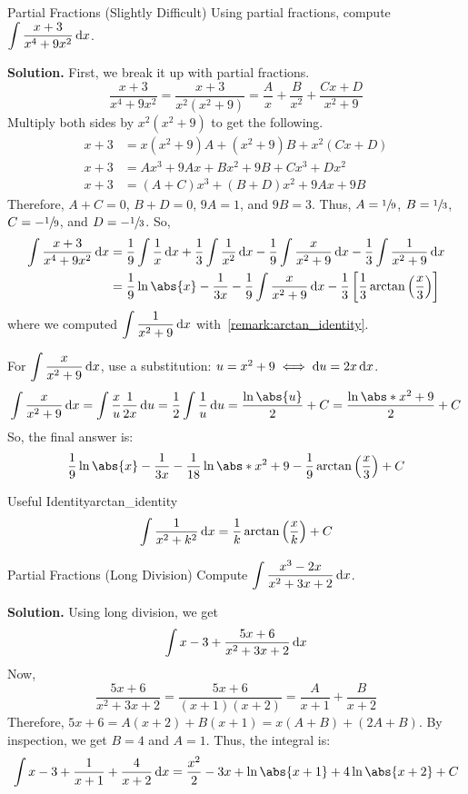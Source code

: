 \begin{Example}{Partial Fractions (Slightly Difficult)}{}
    Using partial fractions, compute $ \displaystyle \int \frac{x+3}{x^4+9x^2} \odif{x} $.

    \textbf{Solution.}
    First, we break it up with partial fractions.
    \[ \frac{x+3}{x^4+9x^2} =\frac{x+3}{x^2(x^2+9)}=\frac{A}{x}+\frac{B}{x^2} +\frac{Cx+D}{x^2+9}  \]
    Multiply both sides by $ x^2(x^2+9) $ to get the following.
    \begin{align*}
        x+3 & =x(x^2+9)A+(x^2+9)B+x^2(Cx+D) \\
        x+3 & =Ax^3+9Ax+Bx^2+9B+Cx^3+Dx^2   \\
        x+3 & =(A+C)x^3+(B+D)x^2+9Ax+9B
    \end{align*}
    Therefore, $ A+C=0 $, $ B+D=0 $, $ 9A=1 $, and $ 9B=3 $. Thus,
    $ A=\sfrac{1}{9} $, $ B=\sfrac{1}{3} $, $ C=-\sfrac{1}{9} $,
    and $ D=-\sfrac{1}{3} $. So,
    \begin{align*}
        \int \frac{x+3}{x^4+9x^2} \odif{x}
         & =\frac{1}{9} \int \frac{1}{x} \odif{x} +\frac{1}{3} \int \frac{1}{x^2} \odif{x}
        -\frac{1}{9} \int \frac{x}{x^2+9} \odif{x} -\frac{1}{3} \int \frac{1}{x^2+9} \odif{x} \\
         & =\frac{1}{9}\ln\abs{x}-\frac{1}{3x}-\frac{1}{9} \int \frac{x}{x^2+9}\odif{x}
        -\frac{1}{3} \left[ \frac{1}{3}\arctan\left( \frac{x}{3}  \right) \right]             \\
    \end{align*}
    where we computed $ \displaystyle \int \frac{1}{x^2+9}\odif{x} $ with~\ref{remark:arctan_identity}.

    For $ \displaystyle \int \frac{x}{x^2+9} \odif{x}  $, use a substitution: $ u=x^2+9\iff \odif{u}=2x\odif{x} $.
    \[
        \int \frac{x}{x^2+9} \odif{x}
        =\int \frac{x}{u} \frac{1}{2x} \odif{u}
        =\frac{1}{2} \int \frac{1}{u} \odif{u}
        =\frac{\ln\abs{u}}{2} +C
        =\frac{\ln\abs*{x^2+9}}{2} +C
    \]
    So, the final answer is:
    \[ \frac{1}{9}\ln\abs{x}-\frac{1}{3x}-\frac{1}{18}\ln\abs*{x^2+9}
        -\frac{1}{9} \arctan\left( \frac{x}{3}  \right)+C \]
\end{Example}

\begin{Remark}{Useful Identity}{arctan_identity}
    \[ \int \frac{1}{x^2+k^2} \odif{x}=\frac{1}{k} \arctan\left( \frac{x}{k}  \right)+C  \]
\end{Remark}

\begin{Example}{Partial Fractions (Long Division)}{}
    Compute $ \displaystyle \int \frac{x^3-2x}{x^2+3x+2} \odif{x} $.

    \textbf{Solution.}
    Using long division, we get
    \[ \int x-3+\frac{5x+6}{x^2+3x+2} \odif{x}  \]
    Now,
    \[ \frac{5x+6}{x^2+3x+2} =\frac{5x+6}{(x+1)(x+2)} =\frac{A}{x+1} +\frac{B}{x+2} \]
    Therefore, $ 5x+6=A(x+2)+B(x+1) = x(A+B)+(2A+B)$. By inspection,
    we get $ B=4 $ and $ A=1 $. Thus, the integral is:
    \[ \int x-3+\frac{1}{x+1} +\frac{4}{x+2} \odif{x} =\frac{x^2}{2} -3x+\ln\abs{x+1}
        +4\ln\abs{x+2}+C \]
\end{Example}
